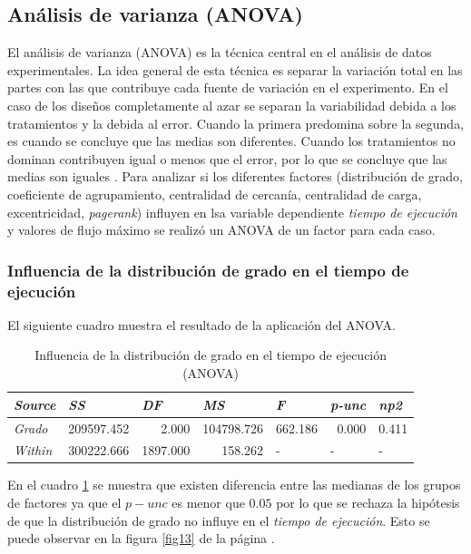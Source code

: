 \documentclass{article}
\begin{document}
\subsection{Análisis de varianza (ANOVA)}
El análisis de varianza (ANOVA) es la técnica central en el análisis de datos experimentales. La idea general de esta técnica es separar la variación total en las partes con las que contribuye cada fuente de variación en el experimento. En el caso de los diseños completamente al azar se separan la variabilidad debida a los tratamientos y la debida al error. Cuando la primera predomina sobre la segunda, es cuando se concluye que las medias son diferentes. Cuando los tratamientos no dominan contribuyen igual o menos que el error, por lo que se concluye que las medias son iguales \cite{ade}.
%
Para analizar si los diferentes factores (distribución de grado, coeficiente de agrupamiento, centralidad de cercanía, centralidad de carga, excentricidad, \textit{pagerank}) influyen en lsa variable dependiente \textit{tiempo de ejecución} y valores de flujo máximo se realizó un ANOVA de un factor para cada caso. 

\subsubsection{Influencia de la distribución de grado en el tiempo de ejecución}
El siguiente cuadro muestra el resultado de la aplicación del ANOVA.
\begin{table}[htbp]
  \centering
  \caption{Influencia de la distribución de grado en el tiempo de ejecución (ANOVA)}
    \begin{tabular}{lrrrlll}
    \toprule
    \textit{\textbf{Source}} & \multicolumn{1}{l}{\textit{\textbf{SS}}} & \multicolumn{1}{l}{\textit{\textbf{DF}}} & \multicolumn{1}{l}{\textit{\textbf{MS}}} & \textit{\textbf{F}} & \textit{\textbf{p-unc}} & \textit{\textbf{np2}} \\
    \midrule
    \textit{Grado} & 209597.452 & 2.000 & 104798.726 & \multicolumn{1}{r}{662.186} & \multicolumn{1}{r}{0.000} & \multicolumn{1}{r}{0.411} \\
    \textit{Within} & 300222.666 & 1897.000 & 158.262 & -     & -     & - \\
    \bottomrule
    \end{tabular}%
  \label{tab:tab3}%
\end{table}%

En el cuadro \ref{tab:tab3} se muestra que existen diferencia entre las medianas de los grupos de factores ya que el \textbf{$p-unc$} es menor que $0.05$ por lo que se rechaza la hipótesis de que la distribución de grado no influye en el \textit{tiempo de ejecución}. Esto se puede observar en la figura \ref{fig13} de la página \pageref{fig13}. 
\end{document}
